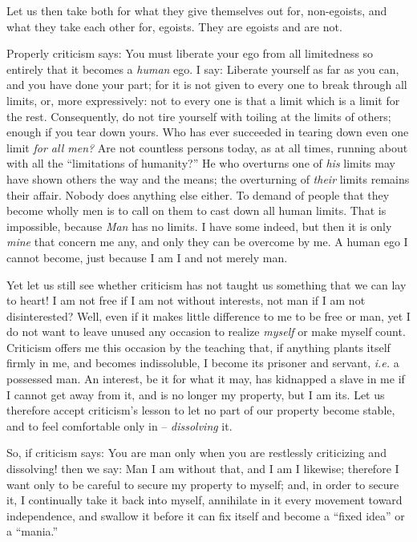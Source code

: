 Let us then take both for what they give themselves out for, non-egoists, and 
what they take each other for, egoists. They are egoists and are not.

Properly criticism says: You must liberate your ego from all limitedness so 
entirely that it becomes a \textit{human} ego. I say: Liberate yourself as far 
as you can, and you have done your part; for it is not given to every one to 
break through all limits, or, more expressively: not to every one is that a 
limit which is a limit for the rest. Consequently, do not tire yourself with 
toiling at the limits of others; enough if you tear down yours. Who has ever 
succeeded in tearing down even one limit \textit{for all men?} Are not 
countless persons today, as at all times, running about with all the 
``limitations of humanity?'' He who overturns one of \textit{his} limits may 
have shown others the way and the means; the overturning of \textit{their} 
limits remains their affair. Nobody does anything else either. To demand of 
people that they become wholly men is to call on them to cast down all human 
limits. That is impossible, because \textit{Man} has no limits. I have some 
indeed, but then it is only \textit{mine} that concern me any, and only they 
can be overcome by me. A human ego I cannot become, just because I am I and 
not merely man.

Yet let us still see whether criticism has not taught us something that we can 
lay to heart! I am not free if I am not without interests, not man if I am not 
disinterested? Well, even if it makes little difference to me to be free or 
man, yet I do not want to leave unused any occasion to realize \textit{myself} 
or make myself count. Criticism offers me this occasion by the teaching that, 
if anything plants itself firmly in me, and becomes indissoluble, I become its 
prisoner and servant, \textit{i.e.} a possessed man. An interest, be it for 
what it may, has kidnapped a slave in me if I cannot get away from it, and is 
no longer my property, but I am its. Let us therefore accept criticism's 
lesson to let no part of our property become stable, and to feel comfortable 
only in -- \textit{dissolving} it.

So, if criticism says: You are man only when you are restlessly criticizing 
and dissolving! then we say: Man I am without that, and I am I likewise; 
therefore I want only to be careful to secure my property to myself; and, in 
order to secure it, I continually take it back into myself, annihilate in it 
every movement toward independence, and swallow it before it can fix itself 
and become a ``fixed idea'' or a ``mania.''

